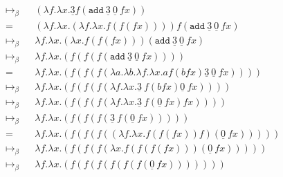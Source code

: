 \documentclass[11pt]{article}
\begin{document}
\begin{enumerate}
\begin{enumerate}
\begin{align*}
			             &  & \mapsto_\beta                                  &   & ( \lambda f. \lambda x. \underline{3} f ( \texttt{add}  \:\underline{3}  \:\underline{0} \: f x ))                               & \\
			             &  & =                                              &   & ( \lambda f. \lambda x. ( \lambda f . \lambda x. f(f(f x)))) f( \texttt{add}  \:\underline{3} \: \underline{0}  \:f x)           & \\
			             &  & \mapsto_\beta                                  &   & \lambda f. \lambda x. ( \lambda x. f(f(f x)))( \texttt{add}  \:\underline{3}  \:\underline{0}  \:f x)                            & \\
			             &  & \mapsto_\beta                                  &   & \lambda f. \lambda x. ( f(f(f( \texttt{add}  \:\underline{3} \: \underline{0}  \:f x ))))                                        & \\
			             &  & =                                              &   & \lambda f. \lambda x. (f(f(f( \lambda a. \lambda b. \lambda f. \lambda x. a f (b f x) \underline{3} \: \underline{0} \: f x )))) & \\
			             &  & \mapsto_\beta                                  &   & \lambda f. \lambda x. (f (f(f( \lambda f. \lambda x. \underline{3} \: f ( b f x) \underline{0} \: f x ))))                       & \\
			             &  & \mapsto_\beta                                  &   & \lambda f. \lambda x. (f(f(f( \lambda f. \lambda x. \underline{3} \: f ( \underline{0} \: f x ) f x))))                          & \\
			             &  & \mapsto_\beta                                  &   & \lambda f. \lambda x. (f(f(f( \underline{3} \: f ( \underline{0} \: f x )))))                                                    & \\
			             &  & =                                              &   & \lambda f. \lambda x. (f(f(f(( \lambda f. \lambda x. f(f(f x)) f)( \underline{0} \: f x )))))                                    & \\
			             &  & \mapsto_\beta                                  &   & \lambda f. \lambda x. (f(f(f( \lambda x. f (f(f(fx)))( \underline{0} \: f x )))))                                                & \\
			             &  & \mapsto_\beta                                  &   & \lambda f. \lambda x. (f(f(f(f(f(f( \underline{0} \: f x )))))))                                                                 & \\

\end{align*}
\end{enumerate}
\end{enumerate}
\end{document}
